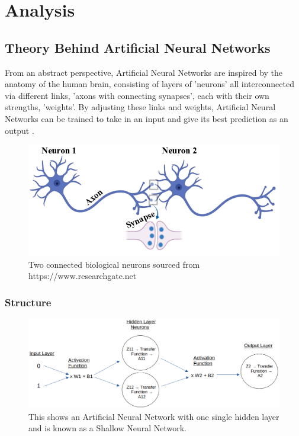 \documentclass[./project-report/src/latex/project-report.tex]{subfiles}
\begin{document}
\maketitle

\clearpage
\section{Analysis}

\subsection{Theory Behind Artificial Neural Networks}
\label{sec:ann-theory}

From an abstract perspective, Artificial Neural Networks are inspired by the anatomy of the human brain, consisting of layers of 'neurons' all interconnected via 
different links, 'axons with connecting synapses', each with their own strengths, 'weights'. By adjusting these links and weights, Artificial Neural Networks can be trained 
to take in an input and give its best prediction as an output \cite{IBMweb}.

\begin{figure}[h!]
\centering
\includegraphics[width=1\textwidth]{./project-report/src/images/connected-neurons.png}
\caption{Two connected biological neurons sourced from https://www.researchgate.net \cite{researchgate}}
\end{figure}

\vspace{5mm}

\subsubsection{Structure}

\begin{figure}[h!]
\centering
\includegraphics[width=1\textwidth]{./project-report/src/images/shallow-ann-diagram.png}
\caption{This shows an Artificial Neural Network with one single hidden layer and is known as a Shallow Neural Network.}
\end{figure}
\end{document}
